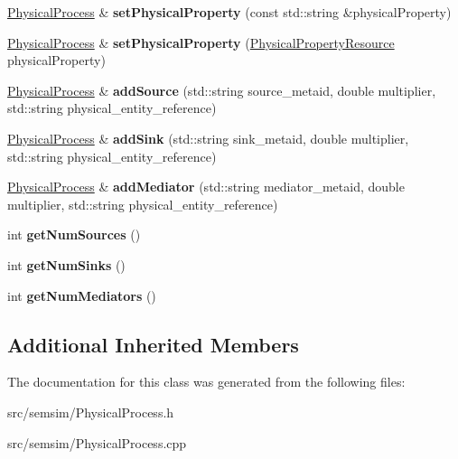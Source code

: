 \begin{DoxyCompactItemize}
\item 
\mbox{\label{classsemsim_1_1PhysicalProcess_a5b0b6e6d5eba493fed10759497057f1b}} 
\hyperlink{classsemsim_1_1PhysicalProcess}{Physical\+Process} \& {\bfseries set\+Physical\+Property} (const std\+::string \&physical\+Property)
\item 
\mbox{\label{classsemsim_1_1PhysicalProcess_ad5015bd89fef10553e03f0f6b4b13085}} 
\hyperlink{classsemsim_1_1PhysicalProcess}{Physical\+Process} \& {\bfseries set\+Physical\+Property} (\hyperlink{classsemsim_1_1PhysicalPropertyResource}{Physical\+Property\+Resource} physical\+Property)
\item 
\mbox{\label{classsemsim_1_1PhysicalProcess_a28eeb2d8344664a842b725249bea7dec}} 
\hyperlink{classsemsim_1_1PhysicalProcess}{Physical\+Process} \& {\bfseries add\+Source} (std\+::string source\+\_\+metaid, double multiplier, std\+::string physical\+\_\+entity\+\_\+reference)
\item 
\mbox{\label{classsemsim_1_1PhysicalProcess_a88c77abfb77d9a006da62fd0c0730007}} 
\hyperlink{classsemsim_1_1PhysicalProcess}{Physical\+Process} \& {\bfseries add\+Sink} (std\+::string sink\+\_\+metaid, double multiplier, std\+::string physical\+\_\+entity\+\_\+reference)
\item 
\mbox{\label{classsemsim_1_1PhysicalProcess_a798bda68e6b2fb7940e3400b003c1d7d}} 
\hyperlink{classsemsim_1_1PhysicalProcess}{Physical\+Process} \& {\bfseries add\+Mediator} (std\+::string mediator\+\_\+metaid, double multiplier, std\+::string physical\+\_\+entity\+\_\+reference)
\item 
\mbox{\label{classsemsim_1_1PhysicalProcess_a07fa014685889073952834086b3a74a4}} 
int {\bfseries get\+Num\+Sources} ()
\item 
\mbox{\label{classsemsim_1_1PhysicalProcess_a66d037746715d730964329cccc5e68ba}} 
int {\bfseries get\+Num\+Sinks} ()
\item 
\mbox{\label{classsemsim_1_1PhysicalProcess_a6223cd90d08c19c4c81f4c72ffb1379b}} 
int {\bfseries get\+Num\+Mediators} ()
\end{DoxyCompactItemize}
\subsection*{Additional Inherited Members}


The documentation for this class was generated from the following files\+:\begin{DoxyCompactItemize}
\item 
src/semsim/Physical\+Process.\+h\item 
src/semsim/Physical\+Process.\+cpp\end{DoxyCompactItemize}
